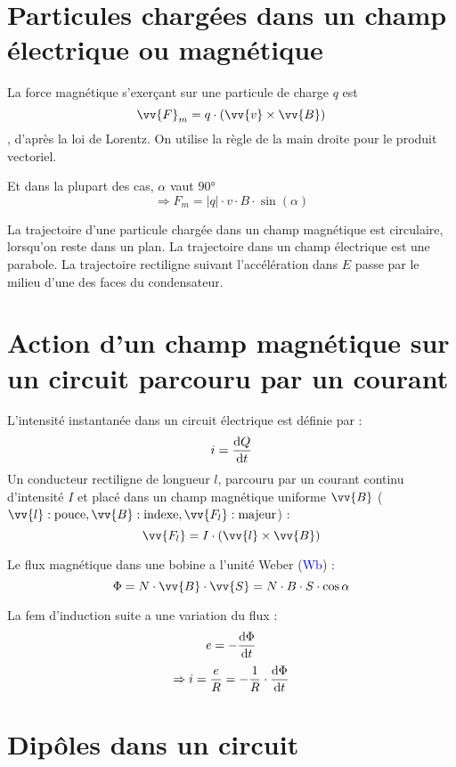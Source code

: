 \documentclass[main.tex]{subfiles}
\begin{document}
\section{Particules chargées dans un champ électrique ou magnétique}

\begin{Definition}
    La force magnétique s'exerçant sur une particule de charge $q$ est
    $$\vv{F}_{m} = q \cdot (\vv{v}\times \vv{B})$$,
    d'après la loi de Lorentz. On utilise la règle de la main droite pour le produit vectoriel.

    Et dans la plupart des cas, $\alpha$ vaut $90°$
    $$\Rightarrow F_{m} = |q| \cdot v \cdot B \cdot \sin(\alpha)$$

    La trajectoire d'une particule chargée dans un champ magnétique est circulaire, lorsqu'on reste dans un plan. La trajectoire dans un champ électrique est une parabole. La trajectoire rectiligne suivant l'accélération dans $E$ passe par le milieu d'une des faces du condensateur.
\end{Definition}


\section{Action d'un champ magnétique sur un circuit parcouru par un courant}


\begin{Definition}
    L'intensité instantanée dans un circuit électrique est définie par :
    $$i = \dfrac{\text{d} Q}{\text{d} t}$$
    Un conducteur rectiligne de longueur $l$, parcouru par un courant continu d'intensité $I$ et placé dans un champ magnétique uniforme $\vv{B}$ ($\vv{l}: \text{pouce}, \vv{B}: \text{indexe}, \vv{F_{l}}: \text{majeur}$) :
    $$\vv{F_{l}} = I \cdot (\vv{l} \times \vv{B})$$

    Le flux magnétique dans une bobine a l'unité Weber (\textcolor{blue}{Wb}) : 
    $$ \Phi = N \cdot \vv{B} \cdot \vv{S} = N \cdot B \cdot S \cdot \cos{\alpha}$$

    La fem d'induction suite a une variation du flux :
    $$e=-\dfrac{\text{d} \Phi}{\text{d} t}$$
    $$\Rightarrow i = \dfrac{e}{R} = - \dfrac{1}{R} \cdot \dfrac{\text{d} \Phi}{\text{d} t}$$
\end{Definition}




\section{Dipôles dans un circuit}
\end{document}
